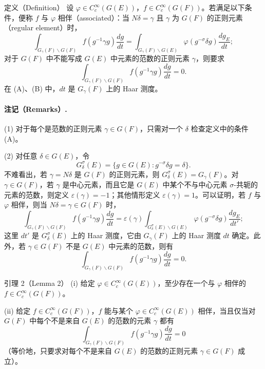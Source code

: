 \begin{originaltheorem}{定义（Definition）}
设 $\varphi\in C_c^\infty(G(E))$，$f\in C_c^\infty(G(F))$。若满足以下条件，便称 $f$ 与 $\varphi$ 相伴（associated）：当 $N\delta=\gamma$ 且 $\gamma$ 为 $G(F)$ 的正则元素（regular element）时，
\begin{equation}
 \int_{G_\gamma(F)\backslash G(F)}f(g^{-1}\gamma g)\frac{dg}{dt}
 =\int_{G_\gamma(F)\backslash G(E)}\varphi(g^{-\sigma}\delta g)\frac{dg_E}{dt};
 \tag{A}
\end{equation}
对于 $G(F)$ 中不能写成 $G(E)$ 中元素的范数的正则元素 $\gamma$，则要求
\begin{equation}
 \int_{G_\gamma(F)\backslash G(F)}f(g^{-1}\gamma g)\frac{dg}{dt}=0.
 \tag{B}
\end{equation}
在 (A)、(B) 中，$dt$ 是 $G_\gamma(F)$ 上的 Haar 测度。
\end{originaltheorem}

\paragraph*{注记（Remarks）.}
(1) 对于每个是范数的正则元素 $\gamma\in G(F)$，只需对一个 $\delta$ 检查定义中的条件 (A)。

(2) 对任意 $\delta\in G(E)$，令
\[
 G_\delta^\sigma(E)=\{g\in G(E):g^{-\sigma}\delta g=\delta\}.
\]
不难看出，若 $\gamma=N\delta$ 是 $G(F)$ 的正则元素，则 $G_\delta^\sigma(E)=G_\gamma(F)$。对 $\gamma\in G(F)$，若 $\gamma$ 是中心元素，而且它是 $G(E)$ 中某个不与中心元素 $\sigma$-共轭的元素的范数，则定义 $\varepsilon(\gamma)=-1$；其他情形定义 $\varepsilon(\gamma)=1$。可以证明，若 $f$ 与 $\varphi$ 相伴，则当 $N\delta=\gamma\in G(F)$ 时，
\begin{equation}
 \int_{G_\gamma(F)\backslash G(F)}f(g^{-1}\gamma g)\frac{dg}{dt}
 =\varepsilon(\gamma)\int_{G_\delta^\sigma(E)\backslash G(E)}
 \varphi(g^{-\sigma}\delta g)\frac{dg_E}{dt'};
 \tag{A$'$}
\end{equation}
这里 $dt'$ 是 $G_\delta^\sigma(E)$ 上的 Haar 测度，它由 $G_\gamma(F)$ 上的 Haar 测度 $dt$ 确定。此外，若 $\gamma\in G(F)$ 不是 $G(E)$ 中元素的范数，则有
\begin{equation}
 \int_{G_\gamma(F)\backslash G(F)}f(g^{-1}\gamma g)\frac{dg}{dt}=0.
 \tag{B$'$}
\end{equation}

\begin{originaltheorem}{引理 2（Lemma 2）}
(i) 给定 $\varphi\in C_c^\infty(G(E))$，至少存在一个与 $\varphi$ 相伴的 $f\in C_c^\infty(G(F))$。

(ii) 给定 $f\in C_c^\infty(G(F))$，$f$ 能与某个 $\varphi\in C_c^\infty(G(E))$ 相伴，当且仅当对 $G(F)$ 中每个不是来自 $G(E)$ 的范数的元素 $\gamma$ 都有
\[
 \int_{G_\gamma(F)\backslash G(F)}f(g^{-1}\gamma g)\frac{dg}{dt}=0
\]
（等价地，只要求对每个不是来自 $G(E)$ 的范数的正则元素 $\gamma\in G(F)$ 成立）。
\end{originaltheorem}

